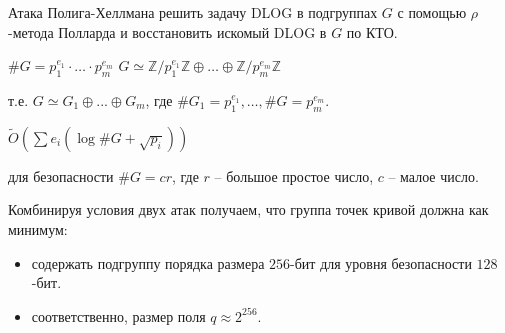 \documentclass{beamer}
\begin{document}
\begin{frame}{Атака Полига-Хеллмана}
     решить задачу DLOG в подгруппах $G$ с помощью $\rho$-метода Полларда и восстановить искомый DLOG в $G$ по КТО.
    \begin{center}
        $\#G = p_1^{e_1} \cdot \ldots \cdot p_m^{e_m}$ \structure{$\implies$} $G \simeq \mathbb{Z} / p_1^{e_1} \mathbb{Z} \oplus \ldots \oplus \mathbb{Z} / p_m^{e_m} \mathbb{Z}$
    \end{center}
    
        т.е. $G \simeq G_1 \oplus ... \oplus G_m$, где $\#G_1 = p_1^{e_1}, \ldots, \#G = p_m^{e_m}$.
    
    \vspace{1em}
    
     $\widetilde{O}(\sum e_i (\log{\#G} + \sqrt{p_i}))$
    
    \begin{center}
        \structure{$\Downarrow$}
    \end{center}
    
     для безопасности $\#G = c r$, где $r$ -- большое простое число, $c$ -- малое число.
\end{frame}

\begin{frame}
    Комбинируя условия двух атак получаем, что группа точек кривой должна как минимум:
\begin{itemize}
    \item содержать подгруппу  порядка размера $256$-бит для уровня безопасности $128$-бит.
    \item соответственно, размер поля $q \approx 2^{256}$.
\end{itemize} 
\end{frame}
\end{document}
